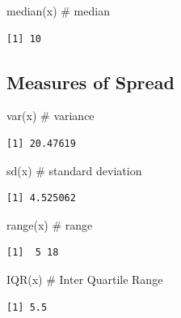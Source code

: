 \documentclass[
  letterpaper,
  DIV=11,
  numbers=noendperiod]{scrreprt}
\newenvironment{Shaded}{\begin{snugshade}}{\end{snugshade}}
\newcommand{\CommentTok}[1]{\textcolor[rgb]{0.37,0.37,0.37}{#1}}
\newcommand{\FunctionTok}[1]{\textcolor[rgb]{0.28,0.35,0.67}{#1}}
\newcommand{\NormalTok}[1]{\textcolor[rgb]{0.00,0.23,0.31}{#1}}
\begin{document}
\begin{Shaded}
\begin{Highlighting}[]
\FunctionTok{median}\NormalTok{(x) }\CommentTok{\# median}
\end{Highlighting}
\end{Shaded}

\begin{verbatim}
[1] 10
\end{verbatim}

\subsection{Measures of Spread}\label{measures-of-spread}

\begin{Shaded}
\begin{Highlighting}[]
\FunctionTok{var}\NormalTok{(x) }\CommentTok{\# variance}
\end{Highlighting}
\end{Shaded}

\begin{verbatim}
[1] 20.47619
\end{verbatim}

\begin{Shaded}
\begin{Highlighting}[]
\FunctionTok{sd}\NormalTok{(x) }\CommentTok{\# standard deviation}
\end{Highlighting}
\end{Shaded}

\begin{verbatim}
[1] 4.525062
\end{verbatim}

\begin{Shaded}
\begin{Highlighting}[]
\FunctionTok{range}\NormalTok{(x) }\CommentTok{\# range}
\end{Highlighting}
\end{Shaded}

\begin{verbatim}
[1]  5 18
\end{verbatim}

\begin{Shaded}
\begin{Highlighting}[]
\FunctionTok{IQR}\NormalTok{(x) }\CommentTok{\# Inter Quartile Range}
\end{Highlighting}
\end{Shaded}

\begin{verbatim}
[1] 5.5
\end{verbatim}
\end{document}
